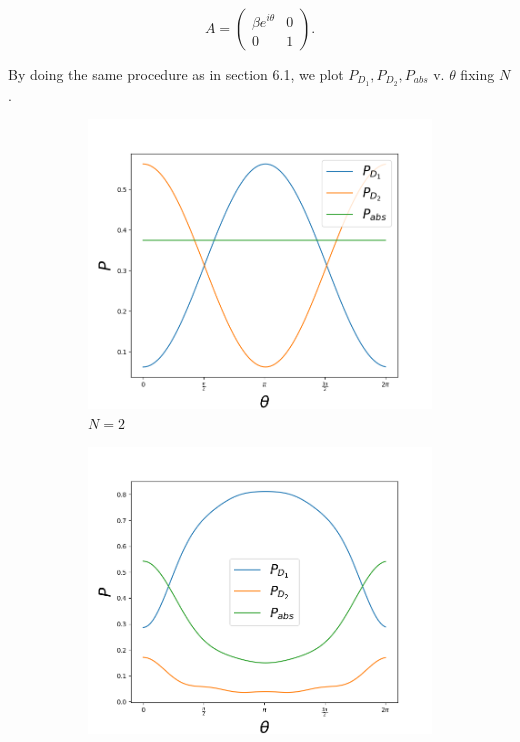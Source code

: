 \documentclass{book}
\begin{document}
\begin{equation}
 A=\begin{pmatrix} \beta e^{i \theta}& 0\\0&  1\end{pmatrix}.
 \end{equation}

By doing the same procedure as in section 6.1, we plot $P_{D_{1}},P_{D_{2}},P_{abs}$ v. $\theta$ fixing $N$.

\begin{figure}[H]
\centering
\begin{subfigure}[b]{0.30\linewidth}
\includegraphics[width=\linewidth]{images/Azuma_phases2.png}
\caption{$N=2$}
\end{subfigure}
\begin{subfigure}[b]{0.30\linewidth}
\includegraphics[width=\linewidth]{images/Azuma_phases5.png}

\end{subfigure}
\end{figure}
\end{document}

